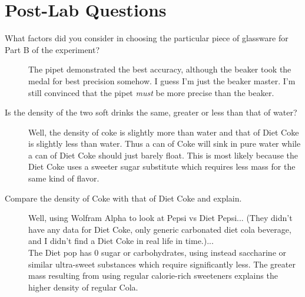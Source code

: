 \documentclass[fleqn,titlepage]{article}
\begin{document}
\section*{Post-Lab Questions}
  \begin{description}
    \item[What factors did you consider in choosing the particular piece of glassware for Part B of the
    experiment?] The pipet demonstrated the best accuracy, although the beaker took the medal for best precision somehow. I guess I'm just the beaker master. I'm still convinced that the pipet \emph{must} be more precise than the beaker.
    \item[Is the density of the two soft drinks the same, greater or less than that of water?] Well, the density of coke is slightly more than water and that of Diet Coke is slightly less than water. Thus a can of Coke will sink in pure water while a can of Diet Coke should just barely float. This is most likely because the Diet Coke uses a sweeter sugar substitute which requires less mass for the same kind of flavor.
    \item[Compare the density of Coke with that of Diet Coke and explain.] Well, using Wolfram Alpha to look at Pepsi vs Diet Pepsi... (They didn't have any data for Diet Coke, only generic carbonated diet cola beverage, and I didn't find a Diet Coke in real life in time.)... \\
    The Diet pop has 0 sugar or carbohydrates, using instead saccharine or similar ultra-sweet substances which require significantly less. The greater mass resulting from using regular calorie-rich sweeteners explains the higher density of regular Cola.

  \end{description}
\end{document}
